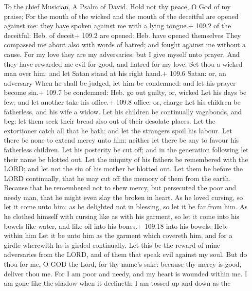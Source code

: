 To the chief Musician, A Psalm of David.  Hold not thy
peace, O God of my praise;  For the mouth of the wicked and
the mouth of the deceitful are opened against me: they have spoken
against me with a lying tongue.+ 109.2 of the deceitful: Heb. of deceit+
109.2 are opened: Heb. have opened themselves  They
compassed me about also with words of hatred; and fought against me
without a cause.  For my love they are my adversaries: but I
give myself unto prayer.  And they have rewarded me evil for
good, and hatred for my love.  Set thou a wicked man over
him: and let Satan stand at his right hand.+ 109.6 Satan: or, an
adversary  When he shall be judged, let him be condemned:
and let his prayer become sin.+ 109.7 be condemned: Heb. go out guilty,
or, wicked  Let his days be few; and let another take his
office.+ 109.8 office: or, charge  Let his children be
fatherless, and his wife a widow.  Let his children be
continually vagabonds, and beg: let them seek their bread also out of
their desolate places.  Let the extortioner catch all that
he hath; and let the strangers spoil his labour.  Let there
be none to extend mercy unto him: neither let there be any to favour his
fatherless children.  Let his posterity be cut off; and in
the generation following let their name be blotted out. 
Let the iniquity of his fathers be remembered with the LORD; and let not
the sin of his mother be blotted out.  Let them be before
the LORD continually, that he may cut off the memory of them from the
earth.  Because that he remembered not to shew mercy, but
persecuted the poor and needy man, that he might even slay the broken in
heart.  As he loved cursing, so let it come unto him: as he
delighted not in blessing, so let it be far from him.  As
he clothed himself with cursing like as with his garment, so let it come
into his bowels like water, and like oil into his bones.+ 109.18 into
his bowels: Heb. within him  Let it be unto him as the
garment which covereth him, and for a girdle wherewith he is girded
continually.  Let this be the reward of mine adversaries
from the LORD, and of them that speak evil against my soul.
 But do thou for me, O GOD the Lord, for thy name's sake:
because thy mercy is good, deliver thou me.  For I am poor
and needy, and my heart is wounded within me.  I am gone
like the shadow when it declineth: I am tossed up and down as the
